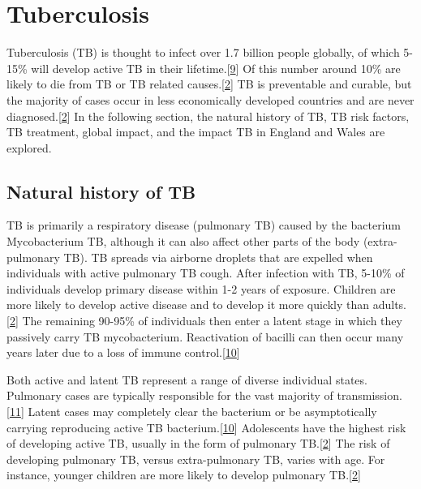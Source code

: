 \documentclass[11pt,twoside]{bristolthesis}
\begin{document}
  \hypertarget{tuberculosis}{%
  \section{Tuberculosis}\label{tuberculosis}}
  
  Tuberculosis (TB) is thought to infect over 1.7 billion people globally, of which 5-15\% will develop active TB in their lifetime.{[}\protect\hyperlink{ref-Houben:2016jp}{9}{]} Of this number around 10\% are likely to die from TB or TB related causes.{[}\protect\hyperlink{ref-TheWorldHealthOrganization:2018va}{2}{]} TB is preventable and curable, but the majority of cases occur in less economically developed countries and are never diagnosed.{[}\protect\hyperlink{ref-TheWorldHealthOrganization:2018va}{2}{]} In the following section, the natural history of TB, TB risk factors, TB treatment, global impact, and the impact TB in England and Wales are explored.
  
  \hypertarget{natural-history-of-tb}{%
  \subsection{Natural history of TB}\label{natural-history-of-tb}}
  
  TB is primarily a respiratory disease (pulmonary TB) caused by the bacterium Mycobacterium TB, although it can also affect other parts of the body (extra-pulmonary TB). TB spreads via airborne droplets that are expelled when individuals with active pulmonary TB cough. After infection with TB, 5-10\% of individuals develop primary disease within 1-2 years of exposure. Children are more likely to develop active disease and to develop it more quickly than adults.{[}\protect\hyperlink{ref-TheWorldHealthOrganization:2018va}{2}{]} The remaining 90-95\% of individuals then enter a latent stage in which they passively carry TB mycobacterium. Reactivation of bacilli can then occur many years later due to a loss of immune control.{[}\protect\hyperlink{ref-Gideon2011a}{10}{]}
  
  Both active and latent TB represent a range of diverse individual states. Pulmonary cases are typically responsible for the vast majority of transmission.{[}\protect\hyperlink{ref-Sepkowitz1996}{11}{]} Latent cases may completely clear the bacterium or be asymptotically carrying reproducing active TB bacterium.{[}\protect\hyperlink{ref-Gideon2011a}{10}{]} Adolescents have the highest risk of developing active TB, usually in the form of pulmonary TB.{[}\protect\hyperlink{ref-TheWorldHealthOrganization:2018va}{2}{]} The risk of developing pulmonary TB, versus extra-pulmonary TB, varies with age. For instance, younger children are more likely to develop pulmonary TB.{[}\protect\hyperlink{ref-TheWorldHealthOrganization:2018va}{2}{]}
  
\end{document}
